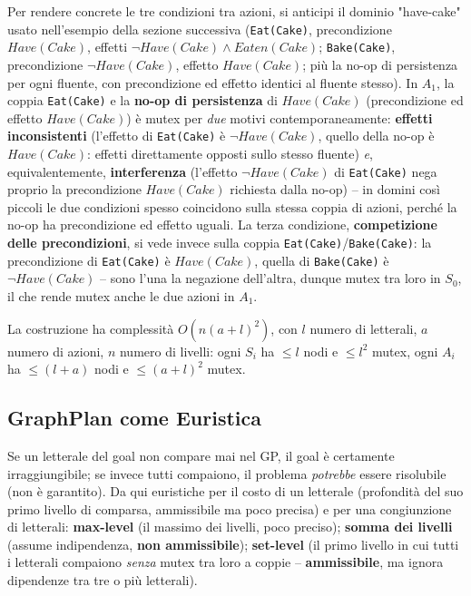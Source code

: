 \documentclass[a4paper,11pt]{article}
\begin{document}
Per rendere concrete le tre condizioni tra azioni, si anticipi il dominio "have-cake" usato nell'esempio della sezione successiva (\texttt{Eat(Cake)}, precondizione $Have(Cake)$, effetti $\neg Have(Cake)\wedge Eaten(Cake)$; \texttt{Bake(Cake)}, precondizione $\neg Have(Cake)$, effetto $Have(Cake)$; più la no-op di persistenza per ogni fluente, con precondizione ed effetto identici al fluente stesso). In $A_1$, la coppia \texttt{Eat(Cake)} e la \textbf{no-op di persistenza} di $Have(Cake)$ (precondizione ed effetto $Have(Cake)$) è mutex per \emph{due} motivi contemporaneamente: \textbf{effetti inconsistenti} (l'effetto di \texttt{Eat(Cake)} è $\neg Have(Cake)$, quello della no-op è $Have(Cake)$: effetti direttamente opposti sullo stesso fluente) \emph{e}, equivalentemente, \textbf{interferenza} (l'effetto $\neg Have(Cake)$ di \texttt{Eat(Cake)} nega proprio la precondizione $Have(Cake)$ richiesta dalla no-op) -- in domini così piccoli le due condizioni spesso coincidono sulla stessa coppia di azioni, perché la no-op ha precondizione ed effetto uguali. La terza condizione, \textbf{competizione delle precondizioni}, si vede invece sulla coppia \texttt{Eat(Cake)}/\texttt{Bake(Cake)}: la precondizione di \texttt{Eat(Cake)} è $Have(Cake)$, quella di \texttt{Bake(Cake)} è $\neg Have(Cake)$ -- sono l'una la negazione dell'altra, dunque mutex tra loro in $S_0$, il che rende mutex anche le due azioni in $A_1$.

La costruzione ha complessità $O(n(a+l)^2)$, con $l$ numero di letterali, $a$ numero di azioni, $n$ numero di livelli: ogni $S_i$ ha $\leq l$ nodi e $\leq l^2$ mutex, ogni $A_i$ ha $\leq(l{+}a)$ nodi e $\leq(a{+}l)^2$ mutex.

\subsection{GraphPlan come Euristica}

Se un letterale del goal non compare mai nel GP, il goal è certamente irraggiungibile; se invece tutti compaiono, il problema \emph{potrebbe} essere risolubile (non è garantito). Da qui euristiche per il costo di un letterale (profondità del suo primo livello di comparsa, ammissibile ma poco precisa) e per una congiunzione di letterali: \textbf{max-level} (il massimo dei livelli, poco preciso); \textbf{somma dei livelli} (assume indipendenza, \textbf{non ammissibile}); \textbf{set-level} (il primo livello in cui tutti i letterali compaiono \emph{senza} mutex tra loro a coppie -- \textbf{ammissibile}, ma ignora dipendenze tra tre o più letterali).
\end{document}

